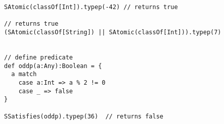 \begin{lstlisting}[style=scalaioScala]
SAtomic(classOf[Int]).typep(-42) // returns true

// returns true
(SAtomic(classOf[String]) || SAtomic(classOf[Int])).typep(7)


// define predicate
def oddp(a:Any):Boolean = {
  a match
    case a:Int => a % 2 != 0
    case _ => false
}

SSatisfies(oddp).typep(36)  // returns false
\end{lstlisting}
